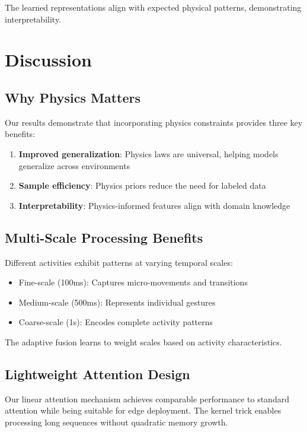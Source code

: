 \documentclass[10pt,conference]{IEEEtran}
\begin{document}
The learned representations align with expected physical patterns, demonstrating interpretability.

\section{Discussion}
\label{sec:discussion}

\subsection{Why Physics Matters}

Our results demonstrate that incorporating physics constraints provides three key benefits:
\begin{enumerate}
    \item \textbf{Improved generalization}: Physics laws are universal, helping models generalize across environments
    \item \textbf{Sample efficiency}: Physics priors reduce the need for labeled data
    \item \textbf{Interpretability}: Physics-informed features align with domain knowledge
\end{enumerate}

\subsection{Multi-Scale Processing Benefits}

Different activities exhibit patterns at varying temporal scales:
\begin{itemize}
    \item Fine-scale (100ms): Captures micro-movements and transitions
    \item Medium-scale (500ms): Represents individual gestures
    \item Coarse-scale (1s): Encodes complete activity patterns
\end{itemize}

The adaptive fusion learns to weight scales based on activity characteristics.

\subsection{Lightweight Attention Design}

Our linear attention mechanism achieves comparable performance to standard attention while being suitable for edge deployment. The kernel trick enables processing long sequences without quadratic memory growth.
\end{document}

